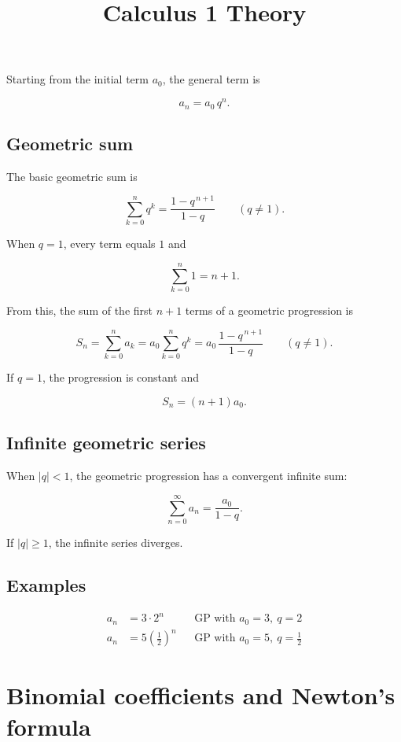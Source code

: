 \documentclass[11pt,a4paper]{article} \usepackage[T1]{fontenc}
\theoremstyle{plain} \newtheorem{theorem}{Theorem} \title{Calculus 1 Theory}
\begin{document}
Starting from the initial term \(a_0\), the general term is

\[
a_n = a_0\, q^n.
\]

\subsection*{Geometric sum}

The basic geometric sum is

\[
\sum_{k=0}^{n} q^k = \frac{1 - q^{\,n+1}}{1 - q} \qquad (q\neq 1).
\]

When \(q=1\), every term equals \(1\) and

\[
\sum_{k=0}^{n} 1 = n+1.
\]

From this, the sum of the first \(n+1\) terms of a geometric progression is

\[
S_n = \sum_{k=0}^{n} a_k
= a_0 \sum_{k=0}^{n} q^k
= a_0\,\frac{1 - q^{\,n+1}}{1 - q}
\qquad (q\neq 1).
\]

If \(q=1\), the progression is constant and

\[
S_n = (n+1)a_0.
\]

\subsection*{Infinite geometric series}

When \(|q|<1\), the geometric progression has a convergent infinite sum:

\[
\sum_{n=0}^{\infty} a_n = \frac{a_0}{1-q}.
\]

If \(|q|\ge 1\), the infinite series diverges.

\subsection*{Examples}

\begin{equation*}

\begin{aligned}
a_n &= 3\cdot 2^n &&\text{GP with } a_0=3,\ q=2\\ a_n &= 5\left(\tfrac12\right)^n &&\text{GP with } a_0=5,\ q=\tfrac12
\end{aligned}

\end{equation*}

\section{Binomial coefficients and Newton's formula}
\end{document}
